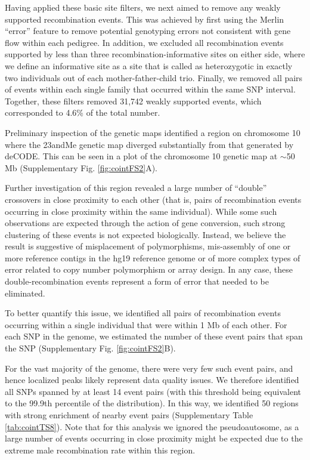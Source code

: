 Having applied these basic site filters, we next aimed to remove any weakly
supported recombination events. This was achieved by first using the Merlin ``error''
feature to remove potential genotyping errors not consistent with gene flow within
each pedigree. In addition, we excluded all recombination events supported by less
than three recombination-informative sites on either side, where we define an
informative site as a site that is called as heterozygotic in exactly two individuals
out of each mother-father-child trio. Finally, we removed all pairs of events within
each single family that occurred within the same SNP interval. Together, these
filters removed 31,742 weakly supported events, which corresponded to 4.6\% of the
total number.

Preliminary inspection of the genetic maps identified a region on chromosome
10 where the 23andMe genetic map diverged substantially from that generated by
deCODE\cite{Kong2010}. This can be seen in a plot of the chromosome 10 genetic map at
$\sim$50 Mb (Supplementary Fig. \ref{fig:cointFS2}A).

Further investigation of this region revealed a large number of ``double''
crossovers in close proximity to each other (that is, pairs of recombination events
occurring in close proximity within the same individual). While some such
observations are expected through the action of gene conversion, such strong
clustering of these events is not expected biologically. Instead, we believe the result
is suggestive of misplacement of polymorphisms, mis-assembly of one or more
reference contigs in the hg19 reference genome or of more complex types of
error related to copy number polymorphism or array design. In any case, these
double-recombination events represent a form of error that needed to be
eliminated.

To better quantify this issue, we identified all pairs of recombination events
occurring within a single individual that were within 1 Mb of each other. For each
SNP in the genome, we estimated the number of these event pairs that span the
SNP (Supplementary Fig. \ref{fig:cointFS2}B).

For the vast majority of the genome, there were very few such event pairs, and
hence localized peaks likely represent data quality issues. We therefore identified all
SNPs spanned by at least 14 event pairs (with this threshold being equivalent 
to the 99.9th percentile of the distribution). In this way, we identified 50 regions
with strong enrichment of nearby event pairs (Supplementary Table \ref{tab:cointTS8}). Note that
for this analysis we ignored the pseudoautosome, as a large number of events
occurring in close proximity might be expected due to the extreme male
recombination rate within this region.

